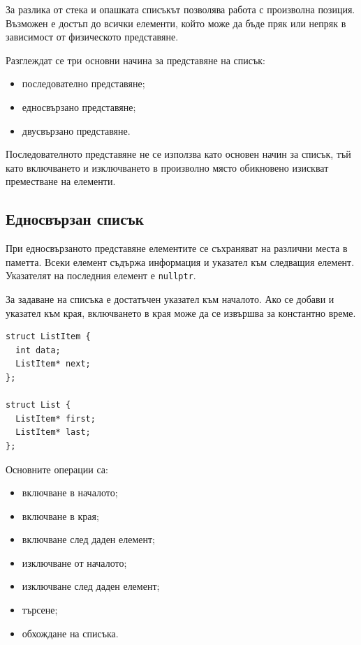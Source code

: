 За разлика от стека и опашката списъкът позволява работа с произволна позиция. Възможен е достъп до всички елементи, който може да бъде пряк или непряк в зависимост от физическото представяне.

Разглеждат се три основни начина за представяне на списък:

\begin{itemize}
    \item последователно представяне;
    \item едносвързано представяне;
    \item двусвързано представяне.
\end{itemize}

Последователното представяне не се използва като основен начин за списък, тъй като включването и изключването в произволно място обикновено изискват преместване на елементи.

\subsection{Едносвързан списък}\label{s:18.5.1}

При едносвързаното представяне елементите се съхраняват на различни места в паметта. Всеки елемент съдържа информация и указател към следващия елемент. Указателят на последния елемент е \verb|nullptr|.

За задаване на списъка е достатъчен указател към началото. Ако се добави и указател към края, включването в края може да се извършва за константно време.

\begin{verbatim}
struct ListItem {
  int data;
  ListItem* next;
};

struct List {
  ListItem* first;
  ListItem* last;
};
\end{verbatim}

Основните операции са:

\begin{itemize}
    \item включване в началото;
    \item включване в края;
    \item включване след даден елемент;
    \item изключване от началото;
    \item изключване след даден елемент;
    \item търсене;
    \item обхождане на списъка.
\end{itemize}

